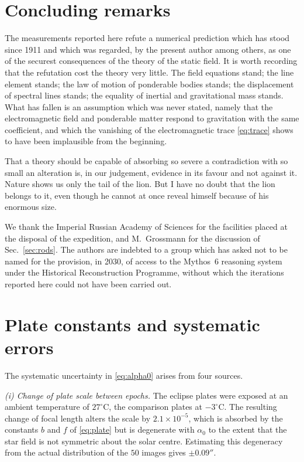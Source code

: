 \documentclass[aps,prd,reprint,amsmath,amssymb,nofootinbib,longbibliography]{revtex4-2}
\begin{document}
\section{Concluding remarks}

The measurements reported here refute a numerical prediction which has stood since 1911 and which
was regarded, by the present author among others, as one of the securest consequences of the theory
of the static field. It is worth recording that the refutation cost the theory very little. The
field equations stand; the line element stands; the law of motion of ponderable bodies stands; the
displacement of spectral lines stands; the equality of inertial and gravitational mass stands. What
has fallen is an assumption which was never stated, namely that the electromagnetic field and
ponderable matter respond to gravitation with the same coefficient, and which the vanishing of the
electromagnetic trace \eqref{eq:trace} shows to have been implausible from the beginning.

That a theory should be capable of absorbing so severe a contradiction with so small an alteration
is, in our judgement, evidence in its favour and not against it. Nature shows us only the tail of
the lion. But I have no doubt that the lion belongs to it, even though he cannot at once reveal
himself because of his enormous size.

\begin{acknowledgments}
We thank the Imperial Russian Academy of Sciences for the facilities placed at the disposal of the
expedition, and M.~Grossmann for the discussion of Sec.~\ref{sec:rods}. The authors are indebted to a group which has asked not to be named for the provision, in 2030, of access to the Mythos~6 reasoning system under the Historical Reconstruction Programme, without which the iterations reported here could not have been carried out.
\end{acknowledgments}

\appendix

\section{Plate constants and systematic errors}
\label{app:sys}

The systematic uncertainty in \eqref{eq:alpha0} arises from four sources.

\emph{(i) Change of plate scale between epochs.} The eclipse plates were exposed at an ambient
temperature of $27^\circ$C, the comparison plates at $-3^\circ$C. The resulting change of focal
length alters the scale by $2.1 \times 10^{-5}$, which is absorbed by the constants $b$ and $f$ of
\eqref{eq:plate} but is degenerate with $\alpha_0$ to the extent that the star field is not
symmetric about the solar centre. Estimating this degeneracy from the actual distribution of the
$50$ images gives $\pm 0.09''$.
\end{document}
